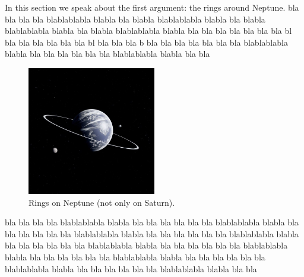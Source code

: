 In this section we speak about the first argument: the rings  around Neptune. 
bla bla bla bla blablablabla blabla bla blabla blablablabla blabla bla blabla blablablabla blabla bla blabla blablablabla blabla bla bla
bla bla bla
bla bla bl
bla bla bla
bla bla bla bl
bla bla bla b
bla bla bla 
bla bla bla bla blablablabla blabla bla bla
bla bla bla bla blablablabla blabla bla bla
\begin{figure}[!h]
\begin{center}
\includegraphics[width=0.5\textwidth]{images/section1/neptune}
\end{center}
\caption{Rings on Neptune (not only on Saturn). \label{fig:neptune}}
\end{figure}
bla bla bla bla blablablabla blabla bla bla
bla bla bla bla blablablabla blabla bla bla
bla bla bla bla blablablabla blabla bla bla
bla bla bla bla blablablabla blabla bla bla
bla bla bla bla blablablabla blabla bla bla
bla bla bla bla blablablabla blabla bla bla
bla bla bla bla blablablabla blabla bla bla
bla bla bla bla blablablabla blabla bla bla
bla bla bla bla blablablabla blabla bla bla
